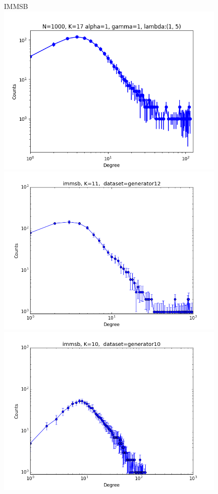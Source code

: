 \documentclass[a4paper, 12pt]{article}
\begin{document}
\begin{figure}[ht]
    \vspace{-3cm}
	\centering IMMSB\\
	\includegraphics[scale=0.27]{img/expe/1_mmsb/figure_1}
	\endminipage
	\includegraphics[scale=0.27]{img/expe/2_mmsb/figure_1}
	\endminipage
	\includegraphics[scale=0.27]{img/expe/3_mmsb/figure_1}

\end{figure}
\end{document}
